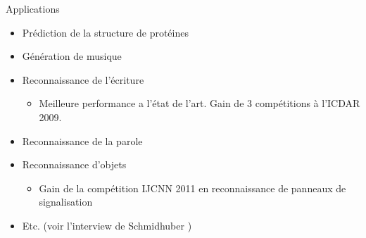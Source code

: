 \begin{frame}{Applications}
    \begin{itemize}
        \item Prédiction de la structure de protéines \cite{Sonderby14}
        \item Génération de musique \cite{Eck02}
        \item Reconnaissance de l'écriture \cite{Graves09a,Graves09b}
        \begin{itemize}
            \item Meilleure performance a l'état de l'art. Gain de 3 compétitions à l'ICDAR 2009.
        \end{itemize}
        \item Reconnaissance de la parole \cite{Graves13a,Graves13b}
        \item Reconnaissance d'objets \cite{Ciresan11a}
        \begin{itemize}
            \item Gain de la compétition IJCNN 2011 en reconnaissance de panneaux de signalisation \cite{Ciresan11b}
        \end{itemize}
        \item Etc. {\footnotesize (voir l'interview de Schmidhuber \cite{Angelica12}})
    \end{itemize}
\end{frame}

